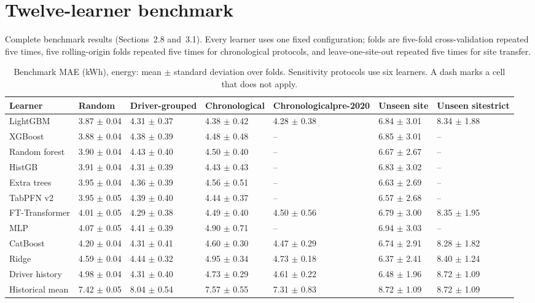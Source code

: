 \section{Twelve-learner benchmark}
Complete benchmark results (Sections~2.8 and~3.1). Every learner uses one fixed configuration; folds are five-fold cross-validation repeated five times, five rolling-origin folds repeated five times for chronological protocols, and leave-one-site-out repeated five times for site transfer.
\begin{table}[H]\centering\scriptsize
\caption{Benchmark MAE (kWh), energy: mean $\pm$ standard deviation over folds. Sensitivity protocols use six learners. A dash marks a cell that does not apply.}\label{tab:s-bench-energy}
\begin{tabular}{lp{2.0cm}p{2.0cm}p{2.0cm}p{2.0cm}p{2.0cm}p{2.0cm}}\toprule
Learner & Random & Driver-grouped & Chronological & Chronological\newline pre-2020 & Unseen site & Unseen site\newline strict \\\midrule
LightGBM & 3.87 $\pm$ 0.04 & 4.31 $\pm$ 0.37 & 4.38 $\pm$ 0.42 & 4.28 $\pm$ 0.38 & 6.84 $\pm$ 3.01 & 8.34 $\pm$ 1.88 \\
XGBoost & 3.88 $\pm$ 0.04 & 4.38 $\pm$ 0.39 & 4.48 $\pm$ 0.48 & -- & 6.85 $\pm$ 3.01 & -- \\
Random forest & 3.90 $\pm$ 0.04 & 4.43 $\pm$ 0.40 & 4.50 $\pm$ 0.40 & -- & 6.67 $\pm$ 2.67 & -- \\
HistGB & 3.91 $\pm$ 0.04 & 4.31 $\pm$ 0.39 & 4.43 $\pm$ 0.43 & -- & 6.83 $\pm$ 3.02 & -- \\
Extra trees & 3.95 $\pm$ 0.04 & 4.36 $\pm$ 0.39 & 4.56 $\pm$ 0.51 & -- & 6.63 $\pm$ 2.69 & -- \\
TabPFN v2 & 3.95 $\pm$ 0.05 & 4.39 $\pm$ 0.40 & 4.44 $\pm$ 0.37 & -- & 6.57 $\pm$ 2.68 & -- \\
FT-Transformer & 4.01 $\pm$ 0.05 & 4.29 $\pm$ 0.38 & 4.49 $\pm$ 0.40 & 4.50 $\pm$ 0.56 & 6.79 $\pm$ 3.00 & 8.35 $\pm$ 1.95 \\
MLP & 4.07 $\pm$ 0.05 & 4.41 $\pm$ 0.39 & 4.90 $\pm$ 0.71 & -- & 6.94 $\pm$ 3.03 & -- \\
CatBoost & 4.20 $\pm$ 0.04 & 4.31 $\pm$ 0.41 & 4.60 $\pm$ 0.30 & 4.47 $\pm$ 0.29 & 6.74 $\pm$ 2.91 & 8.28 $\pm$ 1.82 \\
Ridge & 4.59 $\pm$ 0.04 & 4.44 $\pm$ 0.32 & 4.95 $\pm$ 0.34 & 4.73 $\pm$ 0.18 & 6.37 $\pm$ 2.41 & 8.40 $\pm$ 1.24 \\
Driver history & 4.98 $\pm$ 0.04 & 4.31 $\pm$ 0.40 & 4.73 $\pm$ 0.29 & 4.61 $\pm$ 0.22 & 6.48 $\pm$ 1.96 & 8.72 $\pm$ 1.09 \\
Historical mean & 7.42 $\pm$ 0.05 & 8.04 $\pm$ 0.54 & 7.57 $\pm$ 0.55 & 7.31 $\pm$ 0.83 & 8.72 $\pm$ 1.09 & 8.72 $\pm$ 1.09 \\
\bottomrule\end{tabular}\end{table}

